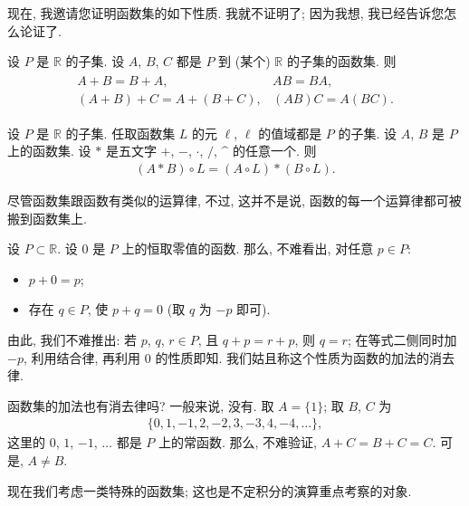 现在, 我邀请您证明函数集的如下性质. 我就不证明了; 因为我想, 我已经告诉您怎么论证了.

\begin{theorem}
    设 $P$ 是 $\mathbb{R}$ 的子集. 设 $A$, $B$, $C$ 都是 $P$ 到 (某个) $\mathbb{R}$ 的子集的函数集. 则
    \begin{align*}
        \begin{array}{ll}
            A + B = B + A,             & AB = BA,            \\
            (A + B) + C = A + (B + C), & (AB)C = A(BC).
        \end{array}
    \end{align*}
\end{theorem}

\begin{theorem}
    设 $P$ 是 $\mathbb{R}$ 的子集. 任取函数集 $L$ 的元 $\ell$, $\ell$ 的值域都是 $P$ 的子集. 设 $A$, $B$ 是 $P$ 上的函数集. 设 $\ast$ 是五文字 $+$, $-$, $\cdot$, $/$, $\text{\textasciicircum}$ 的任意一个. 则
    \begin{align*}
        (A \ast B) \circ L = (A \circ L) \ast (B \circ L).
    \end{align*}
\end{theorem}

尽管函数集跟函数有类似的运算律, 不过, 这并不是说, 函数的每一个运算律都可被搬到函数集上.

\begin{example}
    设 $P \subset \mathbb{R}$. 设 $0$ 是 $P$ 上的恒取零值的函数. 那么, 不难看出, 对任意 $p \in P$:
    \begin{itemize}
        \item $p + 0 = p$;
        \item 存在 $q \in P$, 使 $p + q = 0$ (取 $q$ 为 $-p$ 即可).
    \end{itemize}
    由此, 我们不难推出: 若 $p$, $q$, $r \in P$, 且 $q + p = r + p$, 则 $q = r$; 在等式二侧同时加 $-p$, 利用结合律, 再利用 $0$ 的性质即知. 我们姑且称这个性质为函数的加法的消去律.

    函数集的加法也有消去律吗? 一般来说, 没有. 取 $A = \{ 1 \}$; 取 $B$, $C$ 为
    \begin{align*}
        \{ 0, 1, -1, 2, -2, 3, -3, 4, -4, \dots \},
    \end{align*}
    这里的 $0$, $1$, $-1$, $\dots$ 都是 $P$ 上的常函数. 那么, 不难验证, $A + C = B + C = C$. 可是, $A \neq B$.
\end{example}

现在我们考虑一类特殊的函数集; 这也是不定积分的演算重点考察的对象.

